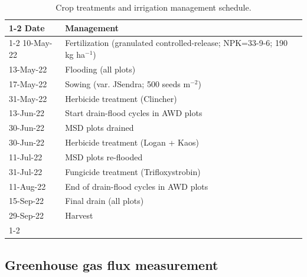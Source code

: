 \begin{table} [htbp]
    \centering
    \footnotesize  
        \caption{Crop treatments and irrigation management schedule.}
    \begin{tabular}{l l}
\cline{1-2}
{Date} & {Management} \\
\cline{1-2}
{10-May-22} & {Fertilization (granulated controlled-release; NPK=33-9-6; 190 kg ha$^{-1}$)} \\
{13-May-22} & {Flooding (all plots)} \\
{17-May-22} & {Sowing (var. JSendra; 500 seeds m$^{-2}$)} \\
{31-May-22} & {Herbicide treatment (Clincher)} \\
{13-Jun-22} & {Start drain-flood cycles in  AWD plots} \\
{30-Jun-22} & {MSD plots drained} \\
{30-Jun-22} & {Herbicide treatment (Logan + Kaos)} \\
{11-Jul-22} & {MSD plots re-flooded} \\
{31-Jul-22} & {Fungicide treatment (Trifloxystrobin)} \\
{11-Aug-22} & {End of drain-flood cycles in  AWD plots} \\
{15-Sep-22} & {Final drain (all plots)} \\
{29-Sep-22} & {Harvest} \\
\cline{1-2}
    \end{tabular}
    \label{field_mgmt1}
\end{table} 


\subsection{Greenhouse gas flux measurement}
\label{sec:meth_GHG1}

